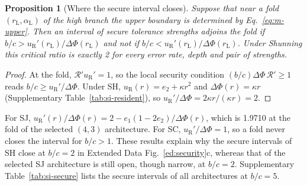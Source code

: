\documentclass[10pt]{wlscirep}
\newcommand{\Rmap}{\mathscr{R}}            %
\theoremstyle{plain}
\newtheorem{proposition}[lemma]{Proposition}
\theoremstyle{remark}
\begin{document}
\begin{proposition}[Where the secure interval closes]\label{prop:closing}
Suppose that near a fold $(r_{\mathrm L},\alpha_{\mathrm L})$ of the high branch the upper boundary is determined by Eq.~\eqref{eq:m-upper}. Then an interval of secure tolerance strengths adjoins the fold if $b/c>u_{\mathrm R}'(r_{\mathrm L})/\Delta\Phi(r_{\mathrm L})$ and not if $b/c<u_{\mathrm R}'(r_{\mathrm L})/\Delta\Phi(r_{\mathrm L})$. Under Shunning this critical ratio is exactly 2 for every error rate, depth and pair of strengths.
\end{proposition}
\begin{proof}
At the fold, $\Rmap'u_{\mathrm R}'=1$, so the local security condition $(b/c)\Delta\Phi\,\Rmap'\geq1$ reads $b/c\geq u_{\mathrm R}'/\Delta\Phi$. Under SH, $u_{\mathrm R}(r)=e_2+\kappa r^2$ and $\Delta\Phi(r)=\kappa r$ (Supplementary Table~\ref{tab:si-resident}), so $u_{\mathrm R}'/\Delta\Phi=2\kappa r/(\kappa r)=2$.
\end{proof}

For SJ, $u_{\mathrm R}'(r)/\Delta\Phi(r)=2-e_1(1-2e_2)/\Delta\Phi(r)$, which is 1.9710 at the fold of the selected $(4,3)$ architecture. For SC, $u_{\mathrm R}'/\Delta\Phi=1$, so a fold never closes the interval for $b/c>1$. These results explain why the secure intervals of SH close at $b/c=2$ in Extended Data Fig.~\ref{ed:security}c, whereas that of the selected SJ architecture is still open, though narrow, at $b/c=2$. Supplementary Table~\ref{tab:si-secure} lists the secure intervals of all architectures at $b/c=5$.
\end{document}
